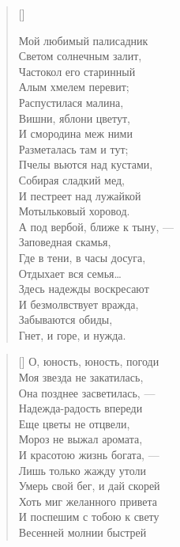 \newpage
\vspace*{0cm}

\settowidth{\versewidth}{Мой любимый полисадник}
\begin{verse}[\versewidth]
\begin{altverse}
Мой любимый палисадник\\
Светом солнечным залит,\\
Частокол его старинный\\
Алым хмелем перевит;\\
Распустилася малина,\\
Вишни, яблони цветут,\\
И смородина меж ними\\
Разметалась там и тут;\\
Пчелы вьются над кустами,\\
Собирая сладкий мед,\\
И пестреет над лужайкой\\
Мотыльковый хоровод.\\
А под вербой, ближе к тыну, ---\\
Заповедная скамья,\\
Где в тени, в часы досуга,\\
Отдыхает вся семья\ldots\\
Здесь надежды воскресают\\
И безмолвствует вражда,\\
Забываются обиды,\\
Гнет, и горе, и нужда.
\end{altverse}
\end{verse}

\newpage
\vspace*{0cm}




\settowidth{\versewidth}{О, юность, юность, погоди\ldotse}
\begin{verse}[\versewidth]
О, юность, юность, погоди\ldotse\\
Моя звезда не закатилась,\\
Она позднее засветилась, ---\\
Надежда-радость впереди\ldotse\\
Еще цветы не отцвели,\\
Мороз не выжал аромата,\\
И красотою жизнь богата, ---\\
Лишь только жажду утоли\ldotst\\
Умерь свой бег, и дай скорей\\
Хоть миг желанного привета\ldotst\\
И поспешим с тобою к свету\\
Весенней молнии быстрей\ldotst
\end{verse}


